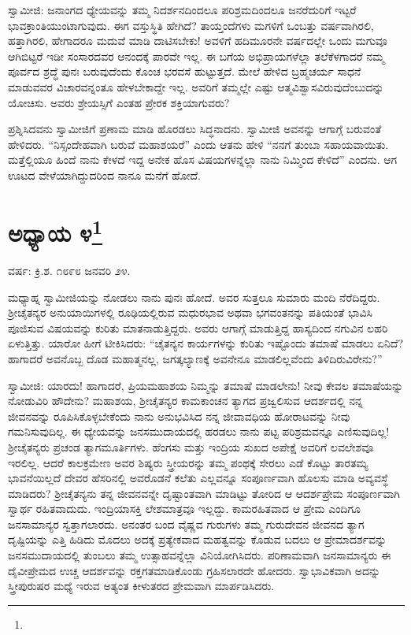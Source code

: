 ಸ್ವಾಮೀಜಿ: ಜನಾಂಗದ ಧ್ಯೇಯವನ್ನು ತಮ್ಮ ನಿದರ್ಶನದಿಂದಲೂ ಪರಿಶ್ರಮದಿಂದಲೂ ಜನರೆದುರಿಗೆ ಇಟ್ಟರೆ ಭಾವಕ್ರಾಂತಿಯುಂಟಾಗುವುದು. ಈಗ ವಸ್ತುಸ್ಥಿತಿ ಹೇಗಿದೆ? ತಾಯ್ತಂದೆಗಳು ಮಗಳಿಗೆ ಒಂಬತ್ತು ವರ್ಷವಾಗಿರಲಿ, ಹತ್ತಾಗಿರಲಿ, ಹೇಗಾದರೂ ಮದುವೆ ಮಾಡಿ ದಾಟಿಸಬೇಕು! ಅವಳಿಗೆ ಹದಿಮೂರನೇ ವರ್ಷದಲ್ಲೇ ಒಂದು ಮಗುವೂ ಆಗಿಬಿಟ್ಟರೆ ಇಡೀ ಸಂಸಾರದವರ ಆನಂದಕ್ಕೆ ಪಾರವೇ ಇಲ್ಲ. ಈ ಬಗೆಯ ಅಭಿಪ್ರಾಯಗಳೆಲ್ಲಾ ತಲೆಕೆಳಗಾದರೆ ನಮ್ಮ ಪೂರ್ವದ ಶ್ರದ್ಧೆ ಪುನಃ ಬರುವುದೆಂದು ಕೊಂಚ ಭರವಸೆ ಹುಟ್ಟುತ್ತದೆ. ಮೇಲೆ ಹೇಳಿದ ಬ್ರಹ್ಮಚರ್ಯ ಸಾಧನೆ ಮಾಡುವವರ ವಿಚಾರವನ್ನಂತೂ ಹೇಳಬೇಕಾದ್ದೇ ಇಲ್ಲ. ಅವರಿಗೆ ತಮ್ಮಲ್ಲೇ ಎಷ್ಟು ಆತ್ಮವಿಶ್ವಾಸವಿರುವುದೆಂಬುದನ್ನು ಯೋಚಿಸು. ಅವರು ಶ್ರೇಯಸ್ಸಿಗೆ ಎಂತಹ ಪ್ರೇರಕ ಶಕ್ತಿಯಾಗುವರು?

ಪ್ರಶ್ನಿಸಿದವನು ಸ್ವಾಮೀಜಿಗೆ ಪ್ರಣಾಮ ಮಾಡಿ ಹೊರಡಲು ಸಿದ್ಧನಾದನು. ಸ್ವಾಮೀಜಿ ಅವನನ್ನು ಆಗಾಗ್ಗೆ ಬರುವಂತೆ ಹೇಳಿದರು. “ನಿಸ್ಸಂದೇಹವಾಗಿ ಬರುವೆ ಮಹಾಶಯರೆ” ಎಂದು ಆತನು ಹೇಳಿ “ನನಗೆ ತುಂಬಾ ಸಹಾಯವಾಯಿತು. ಮತ್ತೆಲ್ಲಿಯೂ ಹಿಂದೆ ನಾನು ಕೇಳದೆ ಇದ್ದ ಅನೇಕ ಹೊಸ ವಿಷಯಗಳನ್ನೆಲ್ಲಾ ನಾನು ನಿಮ್ಮಿಂದ ಕೇಳಿದೆ” ಎಂದನು. ಆಗ ಊಟದ ವೇಳೆಯಾಗಿದ್ದುದರಿಂದ ನಾನೂ ಮನೆಗೆ ಹೋದೆ.

\newpage

\chapter[ಅಧ್ಯಾಯ ೪]{ಅಧ್ಯಾಯ ೪\protect\footnote{}}

\begin{center}
ವರ್ಷ: ಕ್ರಿ.ಶ. ೧೮೯೮ ಜನವರಿ ೨೪.
\end{center}

ಮಧ್ಯಾಹ್ನ ಸ್ವಾಮೀಜಿಯನ್ನು ನೋಡಲು ನಾನು ಪುನಃ ಹೋದೆ. ಅವರ ಸುತ್ತಲೂ ಸುಮಾರು ಮಂದಿ ನೆರೆದಿದ್ದರು. ಶ‍್ರೀಚೈತನ್ಯರ ಅನುಯಾಯಿಗಳಲ್ಲಿ ರೂಢಿಯಲ್ಲಿರುವ ಮಧುರಭಾವ ಅಥವಾ ಭಗವಂತನನ್ನು ಪತಿಯಂತೆ ಭಾವಿಸಿ ಪೂಜಿಸುವ ವಿಷಯವನ್ನು ಕುರಿತು ಮಾತನಾಡುತ್ತಿದ್ದರು. ಅವರು ಆಗಾಗ್ಗೆ ಮಾಡುತ್ತಿದ್ದ ಹಾಸ್ಯದಿಂದ ನಗುವಿನ ಲಹರಿ ಏಳುತ್ತಿತ್ತು. ಯಾರೋ ಹೀಗೆ ಟೀಕಿಸಿದರು: “ಚೈತನ್ಯನ ಕಾರ್ಯಗಳನ್ನು ಕುರಿತು ಇಷ್ಟೊಂದು ತಮಾಷೆ ಮಾಡಲು ಏನಿದೆ? ಹಾಗಾದರೆ ಅವನೊಬ್ಬ ದೊಡ ಮಹಾತ್ಮನಲ್ಲ, ಜಗತ್ಕಲ್ಯಾಣಕ್ಕೆ ಅವನೇನೂ ಮಾಡಲಿಲ್ಲವೆಂದು ತಿಳಿದಿರುವಿರೇನು?”

ಸ್ವಾಮೀಜಿ: ಯಾರದು! ಹಾಗಾದರೆ, ಪ್ರಿಯಮಹಾಶಯ ನಿಮ್ಮನ್ನು ತಮಾಷೆ ಮಾಡಲೇನು! ನೀವು ಕೇವಲ ತಮಾಷೆಯನ್ನು ನೋಡುವಿರಿ ಹೌದೇನು? ಮಹಾಶಯ, ಶ‍್ರೀಚೈತನ್ಯರ ಕಾಮಕಾಂಚನ ತ್ಯಾಗದ ಪ್ರಜ್ವಲಿಸುವ ಆದರ್ಶದಲ್ಲಿ ನನ್ನ ಜೀವನವನ್ನು ರೂಪಿಸಿಕೊಳ್ಳಬೇಕೆಂದು ನಾನು ಅನುಭವಿಸಿದ ನನ್ನ ಜೀವಾವಧಿಯ ಹೋರಾಟವನ್ನು ನೀವು ಗಮನಿಸುವುದಿಲ್ಲ. ಈ ಧ್ಯೇಯವನ್ನು ಜನಸಮುದಾಯದಲ್ಲಿ ಹರಡಲು ನಾನು ಪಟ್ಟ ಪರಿಶ್ರಮವನ್ನೂ ಎಣಿಸುವುದಿಲ್ಲ! ಶ‍್ರೀಚೈತನ್ಯರು ಪ್ರಚಂಡ ತ್ಯಾಗಮೂರ್ತಿಗಳು. ಹೆಂಗಸು ಮತ್ತು ಇಂದ್ರಿಯ ಸುಖದ ಅಪೇಕ್ಷೆ ಅವರಿಗೆ ಲವಲೇಶವೂ ಇರಲಿಲ್ಲ. ಆದರೆ ಕಾಲಕ್ರಮೇಣ ಅವರ ಶಿಷ್ಯರು ಸ್ತ್ರೀಯರನ್ನು ತಮ್ಮ ಪಂಥಕ್ಕೆ ಸೇರಲು ಎಡೆ ಕೊಟ್ಟು ತಾರತಮ್ಯ ಭಾವನೆಯಿಲ್ಲದೆ ದೇವರ ಹೆಸರಿನಲ್ಲಿ ಅವರೊಡನೆ ಕಲೆತು ಎಲ್ಲವನ್ನೂ ಸಂಪೂರ್ಣವಾಗಿ ಹೊಲಸು ಮಾಡಿ ಅವ್ಯವಸ್ಥೆ ಮಾಡಿದರು? ಶ‍್ರೀಚೈತನ್ಯನು ತನ್ನ ಜೀವನವನ್ನೇ ದೃಷ್ಟಾಂತವಾಗಿ ಮಾಡಿಟ್ಟು ತೋರಿದ ಆ ಆದರ್ಶಪ್ರೇಮ ಸಂಪೂರ್ಣವಾಗಿ ಸ್ವಾರ್ಥ ರಹಿತವಾದುದು. ಇಂದ್ರಿಯಾಸಕ್ತಿ ಲೇಶಮಾತ್ರವೂ ಇಲ್ಲದ್ದು. ಕಾಮರಹಿತವಾದ ಆ ಪ್ರೇಮ ಎಂದಿಗೂ ಜನಸಾಮಾನ್ಯರ ಸ್ವತ್ತಾಗಲಾರದು. ಅನಂತರ ಬಂದ ವೈಷ್ಣವ ಗುರುಗಳು ತಮ್ಮ ಗುರುದೇವನ ಜೀವನದ ತ್ಯಾಗ ದೃಷ್ಟಿಯನ್ನು ಎತ್ತಿ ಹಿಡಿದು ಮೊದಲು ಅದಕ್ಕೆ ಪ್ರತ್ಯೇಕವಾದ ಮಹತ್ವವನ್ನು ಕೊಡುವ ಬದಲು ಆ ಪ್ರೇಮಾದರ್ಶವನ್ನು ಜನಸಮುದಾಯದಲ್ಲಿ ತುಂಬಲು ತಮ್ಮ ಉತ್ಸಾಹವನ್ನೆಲ್ಲಾ ವಿನಿಯೋಗಿಸಿದರು. ಪರಿಣಾಮವಾಗಿ ಜನಸಾಮಾನ್ಯರು ಈ ದೈವೀಪ್ರೇಮದ ಉಚ್ಚ ಆದರ್ಶವನ್ನು ರಕ್ತಗತಮಾಡಿಕೊಂಡು ಗ್ರಹಿಸಲಾರದೇ ಹೋದರು. ಸ್ವಾಭಾವಿಕವಾಗಿ ಅದನ್ನು ಸ್ತ್ರೀಪುರುಷರ ಮಧ್ಯೆ ಇರುವ ಅತ್ಯಂತ ಕೀಳುತರದ ಪ್ರೇಮವಾಗಿ ಮಾರ್ಪಡಿಸಿದರು.

